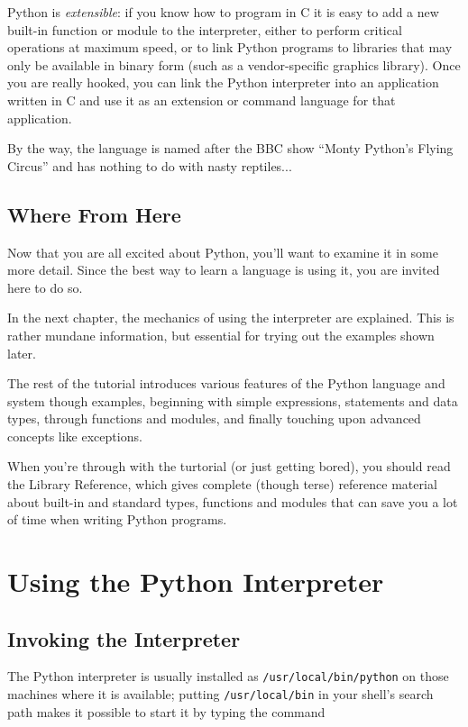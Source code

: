 Python is {\em extensible}: if you know how to program in C it is easy
to add a new built-in
function or
module to the interpreter, either to
perform critical operations at maximum speed, or to link Python
programs to libraries that may only be available in binary form (such
as a vendor-specific graphics library).  Once you are really hooked,
you can link the Python interpreter into an application written in C
and use it as an extension or command language for that application.

By the way, the language is named after the BBC show ``Monty
Python's Flying Circus'' and has nothing to do with nasty reptiles...

\section{Where From Here}

Now that you are all excited about Python, you'll want to examine it
in some more detail.  Since the best way to learn a language is
using it, you are invited here to do so.

In the next chapter, the mechanics of using the interpreter are
explained.  This is rather mundane information, but essential for
trying out the examples shown later.

The rest of the tutorial introduces various features of the Python
language and system though examples, beginning with simple
expressions, statements and data types, through functions and modules,
and finally touching upon advanced concepts like exceptions.

When you're through with the turtorial (or just getting bored), you
should read the Library Reference, which gives complete (though terse)
reference material about built-in and standard types, functions and
modules that can save you a lot of time when writing Python programs.


\chapter{Using the Python Interpreter}

\section{Invoking the Interpreter}

The Python interpreter is usually installed as {\tt /usr/local/bin/python}
on those machines where it is available; putting {\tt /usr/local/bin} in
your {\UNIX} shell's search path makes it possible to start it by
typing the command

